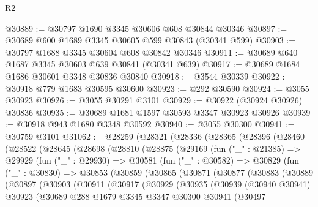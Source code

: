 \begin{lexlean}{R2}
\begin{coremodule}
@30889 := @30797 @1690 @3345 @30606 @608 @30844 @30346
@30897 := @30689 @600 @1689 @3345 @30605 @599 @30843 (@30341 @599)
@30903 := @30797 @1688 @3345 @30604 @608 @30842 @30346
@30911 := @30689 @640 @1687 @3345 @30603 @639 @30841 (@30341 @639)
@30917 := @30689 @1684 @1686 @30601 @3348 @30836 @30840
@30918 := @3544 @30339
@30922 := @30918 @779 @1683 @30595 @30600
@30923 := @292 @30590
@30924 := @3055 @30923
@30926 := @3055 @30291 @3101
@30929 := @30922 (@30924 @30926) @30836
@30935 := @30689 @1681 @1597 @30593 @3347 @30923 @30926
@30939 := @30918 @943 @1680 @3348 @30592
@30940 := @3055 @30300
@30941 := @30759 @3101
@31062 := @28259
    (@28321
      (@28336
        (@28365
          (@28396
            (@28460
              (@28522
                (@28645
                  (@28698
                    (@28810
                      (@28875
                        (@29169
                          (fun ("_" : @21385) =>
                          @29929
                            (fun ("_" : @29930) =>
                            @30581
                              (fun ("_" : @30582) =>
                              @30829
                                (fun ("_" : @30830) =>
                                @30853
                                  (@30859
                                    (@30865
                                      (@30871
                                        (@30877
                                          (@30883
                                            (@30889
                                              (@30897
                                                (@30903
                                                  (@30911
                                                    (@30917
                                                      (@30929
                                                        (@30935
                                                          (@30939
                                                            (@30940 @30941)
                                                            @30923
                                                            (@30689
                                                              @288
                                                              @1679
                                                              @3345
                                                              @3347
                                                              @30300
                                                              @30941
                                                              (@30497

\end{coremodule}
\end{lexlean}
